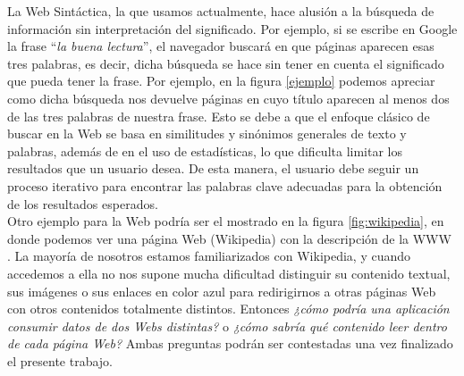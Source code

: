






La Web Sintáctica, la que usamos actualmente, hace alusión a la búsqueda de información sin interpretación del significado. Por ejemplo, si se escribe en Google la frase ``\textit{la buena lectura}'', el navegador buscará en que páginas aparecen esas tres palabras, es decir, dicha búsqueda se hace sin tener en cuenta el significado que pueda tener la frase. Por ejemplo, en la figura \ref{ejemplo} podemos apreciar como dicha búsqueda nos devuelve páginas en cuyo título aparecen al menos dos de las tres palabras de nuestra frase. Esto se debe a que el enfoque clásico de buscar en la Web se basa en similitudes y sinónimos generales de texto y palabras, además de en el uso de estadísticas, lo que dificulta limitar los resultados que un usuario desea. De esta manera, el usuario debe seguir un proceso iterativo para encontrar las palabras clave adecuadas para la obtención de los resultados esperados.\\



Otro ejemplo para la Web podría ser el mostrado en la figura \ref{fig:wikipedia}, en donde podemos ver una página Web (Wikipedia) con la descripción de la WWW \cite{coursera}. La mayoría de nosotros estamos familiarizados con Wikipedia, y cuando accedemos a ella no nos supone mucha dificultad distinguir su contenido textual, sus imágenes o sus enlaces en color azul para redirigirnos a otras páginas Web con otros contenidos totalmente distintos. Entonces \textit{¿cómo podría una aplicación consumir datos de dos Webs distintas?} o \textit{¿cómo sabría qué contenido leer dentro de cada página Web?} Ambas preguntas podrán ser contestadas una vez finalizado el presente trabajo.

